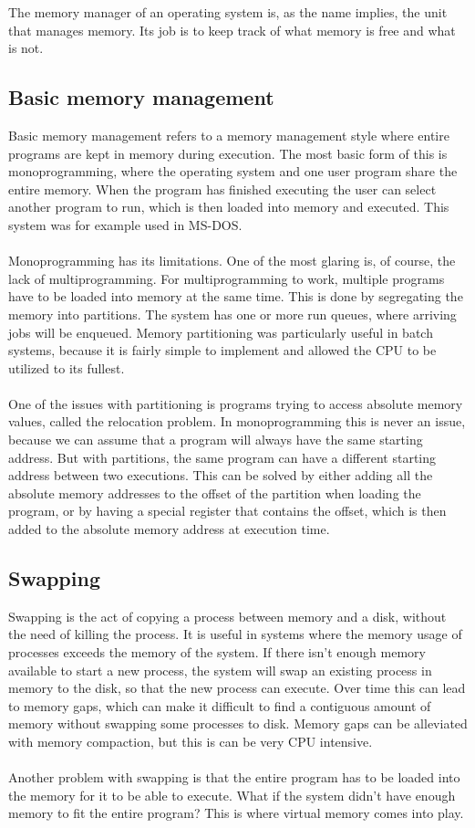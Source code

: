 The memory manager of an operating system is, as the name implies, the unit that manages memory. Its job is to keep track of what memory is free and what is not.

\subsection{Basic memory management}
Basic memory management refers to a memory management style where entire programs are kept in memory during execution. The most basic form of this is monoprogramming, where the operating system and one user program share the entire memory. When the program has finished executing the user can select another program to run, which is then loaded into memory and executed. This system was for example used in MS-DOS.\\\\
Monoprogramming has its limitations. One of the most glaring is, of course, the lack of multiprogramming. For multiprogramming to work, multiple programs have to be loaded into memory at the same time. This is done by segregating the memory into partitions. The system has one or more run queues, where arriving jobs will be enqueued. Memory partitioning was particularly useful in batch systems, because it is fairly simple to implement and allowed the CPU to be utilized to its fullest.\\\\
One of the issues with partitioning is programs trying to access absolute memory values, called the relocation problem. In monoprogramming this is never an issue, because we can assume that a program will always have the same starting address. But with partitions, the same program can have a different starting address between two executions. This can be solved by either adding all the absolute memory addresses to the offset of the partition when loading the program, or by having a special register that contains the offset, which is then added to the absolute memory address at execution time.

\subsection{Swapping}
Swapping is the act of copying a process between memory and a disk, without the need of killing the process. It is useful in systems where the memory usage of processes exceeds the memory of the system. If there isn't enough memory available to start a new process, the system will swap an existing process in memory to the disk, so that the new process can execute. Over time this can lead to memory gaps, which can make it difficult to find a contiguous amount of memory without swapping some processes to disk. Memory gaps can be alleviated with memory compaction, but this is can be very CPU intensive.\\\\
Another problem with swapping is that the entire program has to be loaded into the memory for it to be able to execute. What if the system didn't have enough memory to fit the entire program? This is where virtual memory comes into play.

